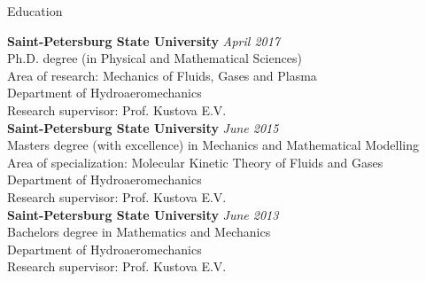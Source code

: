\documentclass{resume} %
\begin{document}
\pagebreak
\begin{rSection}{Education}

{\bf Saint-Petersburg State University} \hfill {\em April 2017} \\ 
Ph.D. degree (in Physical and Mathematical Sciences)\\
Area of research: Mechanics of Fluids, Gases and Plasma \\
Department of Hydroaeromechanics \smallskip \\
Research supervisor: Prof. Kustova E.V. \\

{\bf Saint-Petersburg State University} \hfill {\em June 2015} \\ 
Masters degree (with excellence) in Mechanics and Mathematical Modelling\\
Area of specialization: Molecular Kinetic Theory of Fluids and Gases\\
Department of Hydroaeromechanics \smallskip \\
Research supervisor: Prof. Kustova E.V. \\

{\bf Saint-Petersburg State University} \hfill {\em June 2013} \\ 
Bachelors degree in Mathematics and Mechanics \\
Department of Hydroaeromechanics \smallskip \\
Research supervisor: Prof. Kustova E.V. \\

\end{rSection}
\end{document}
